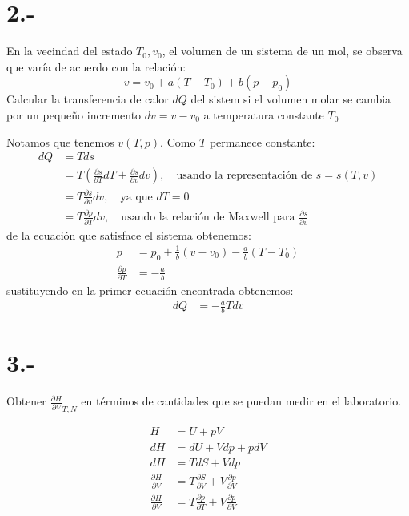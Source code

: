 \documentclass{article}
\begin{document}
\section*{2.-}
En la vecindad del estado $T_0,v_0$, el volumen de un sistema de un mol, se observa que varía 
de acuerdo con la relación:
\[ v = v_0 + a(T-T_0) + b(p-p_0) \]
Calcular la transferencia de calor $dQ$ del sistem si el volumen molar se cambia por un pequeño
incremento $dv = v-v_0$ a temperatura constante $T_0$
\begin{tcolorbox}[breakable]
    Notamos que tenemos $v(T,p)$. Como $T$ permanece constante:
    \begin{align*}
        dQ 
        &= Tds \\
        &= T\left(\frac{\partial s}{\partial T}dT + \frac{\partial s}{\partial v}dv \right), \quad \text{usando la representación de $s=s(T,v)$} \\
        &= T\frac{\partial s}{\partial v}dv, \quad \text{ya que $dT = 0$} \\
        &= T\frac{\partial p}{\partial T}dv, \quad \text{usando la relación de Maxwell para $\frac{\partial s}{\partial v}$}
    \end{align*}
    de la ecuación que satisface el sistema obtenemos:
    \begin{align*}
        p &= p_0 + \frac{1}{b}(v-v_0) - \frac{a}{b}(T-T_0) \\
        \frac{\partial p}{\partial T} &= -\frac{a}{b}
    \end{align*}
    sustituyendo en la primer ecuación encontrada obtenemos:
    \begin{align*}
        dQ
        &= -\frac{a}{b}Tdv
    \end{align*}
\end{tcolorbox}

\section*{3.-}
Obtener $\frac{\partial H}{\partial V}_{T,N}$ en términos de cantidades que se puedan medir en el 
laboratorio.
\begin{tcolorbox}[breakable]
    \begin{align*}
        H &= U + pV \\
        dH &= dU + Vdp + pdV \\
        dH &= TdS + Vdp \\
        \frac{\partial H}{\partial V} &= T\frac{\partial S}{\partial V} + V\frac{\partial p}{\partial V} \\
        \frac{\partial H}{\partial V} &= T\frac{\partial p}{\partial T} + V\frac{\partial p}{\partial V} 
    \end{align*}
\end{tcolorbox}
\end{document}
